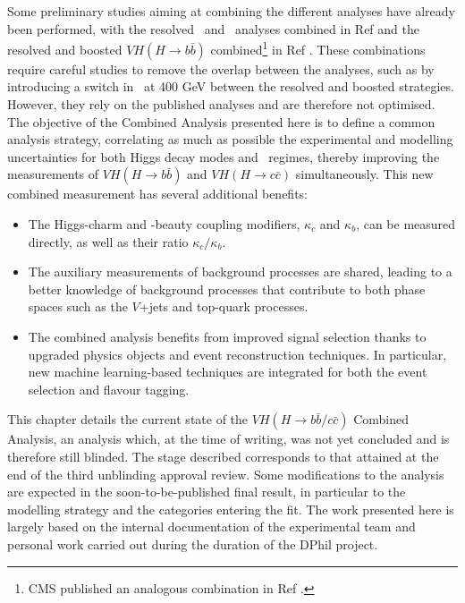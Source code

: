 Some preliminary studies aiming at combining the different analyses have already been performed, with the resolved \vhb\ and \vhc\ analyses combined in Ref \cite{Collaboration:2721696} and the resolved and boosted $VH (H \rightarrow b\bar{b})$ combined\footnote{CMS published an analogous combination in Ref \cite{CMS-PAS-HIG-20-001}.} in Ref \cite{ATLAS:2021wqh}. These combinations require careful studies to remove the overlap between the analyses, such as by introducing a switch in \ptv\ at 400 GeV between the resolved and boosted strategies. However, they rely on the published analyses and are therefore not optimised. The objective of the Combined Analysis presented here is to define a common analysis strategy, correlating as much as possible the experimental and modelling uncertainties for both Higgs decay modes and \ptv\ regimes, thereby improving the measurements of $VH (H \rightarrow b\bar{b})$ and $VH (H \rightarrow c\bar{c})$ simultaneously. This new combined measurement has several additional benefits: 
\begin{itemize}
\item The Higgs-charm and -beauty coupling modifiers, $\kappa_c$ and $\kappa_b$, can be measured directly, as well as their ratio $\kappa_c/\kappa_b$. 
\item The auxiliary measurements of background processes are shared, leading to a better knowledge of background processes that contribute to both phase spaces such as the $V$+jets and top-quark processes.
\item The combined analysis benefits from improved signal selection thanks to upgraded physics objects and event reconstruction techniques. In particular, new machine learning-based techniques are integrated for both the event selection and flavour tagging.
\end{itemize}

This chapter details the current state of the $VH (H\rightarrow b\bar{b}/c\bar{c})$ Combined Analysis, an analysis which, at the time of writing, was not yet concluded and is therefore still blinded. The stage described corresponds to that attained at the end of the third unblinding approval review. Some modifications to the analysis are expected in the soon-to-be-published final result, in particular to the modelling strategy and the categories entering the fit. The work presented here is largely based on the internal documentation of the experimental team and personal work carried out during the duration of the DPhil project. 

